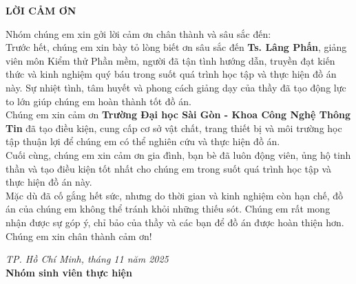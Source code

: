 \newpage
\thispagestyle{empty}
\vspace*{3cm}
\begin{center}
{\Large\textbf{\textcolor{uitblue}{LỜI CẢM ƠN}}}
\end{center}

\vspace{1cm}

\noindent Nhóm chúng em xin gởi lời cảm ơn chân thành và sâu sắc đến:\\

Trước hết, chúng em xin bày tỏ lòng biết ơn sâu sắc đến \textbf{Ts. Lâng Phấn}, giảng viên môn Kiểm thử Phần mềm, người đã tận tình hướng dẫn, truyền đạt kiến thức và kinh nghiệm quý báu trong suốt quá trình học tập và thực hiện đồ án này. Sự nhiệt tình, tâm huyết và phong cách giảng dạy của thầy đã tạo động lực to lớn giúp chúng em hoàn thành tốt đồ án.\\

Chúng em xin cảm ơn \textbf{Trường Đại học Sài Gòn - Khoa Công Nghệ Thông Tin} đã tạo điều kiện, cung cấp cơ sở vật chất, trang thiết bị và môi trường học tập thuận lợi để chúng em có thể nghiên cứu và thực hiện đồ án.\\

Cuối cùng, chúng em xin cảm ơn gia đình, bạn bè đã luôn động viên, ủng hộ tinh thần và tạo điều kiện tốt nhất cho chúng em trong suốt quá trình học tập và thực hiện đồ án này.\\

Mặc dù đã cố gắng hết sức, nhưng do thời gian và kinh nghiệm còn hạn chế, đồ án của chúng em không thể tránh khỏi những thiếu sót. Chúng em rất mong nhận được sự góp ý, chỉ bảo của thầy và các bạn để đồ án được hoàn thiện hơn.\\

\noindent Chúng em xin chân thành cảm ơn!\\

\vfill

\begin{flushright}
\textit{TP. Hồ Chí Minh, tháng 11 năm 2025}\\
\textbf{Nhóm sinh viên thực hiện}
\end{flushright}
